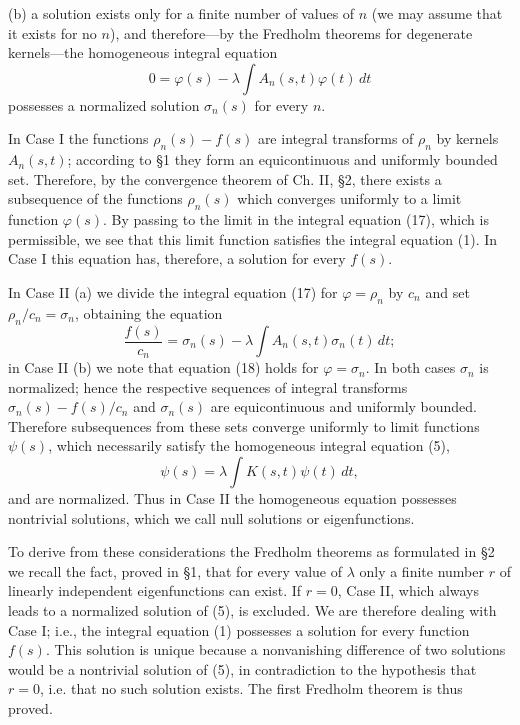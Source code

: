 (b) a solution exists only for a finite number of values of $n$ (we may assume that it exists for no $n$), and therefore---by the Fredholm theorems for degenerate kernels---the homogeneous integral equation
\begin{equation}\tag{18}
0=\varphi(s)-\lambda\int A_n(s,t)\varphi(t)\,dt
\end{equation}
possesses a normalized solution $\sigma_n(s)$ for every $n$.

In Case I the functions $\rho_n(s)-f(s)$ are integral transforms of $\rho_n$ by kernels $A_n(s,t)$; according to \S1 they form an equicontinuous and uniformly bounded set. Therefore, by the convergence theorem of Ch. II, \S2, there exists a subsequence of the functions $\rho_n(s)$ which converges uniformly to a limit function $\varphi(s)$. By passing to the limit in the integral equation (17), which is permissible, we see that this limit function satisfies the integral equation (1). In Case I this equation has, therefore, a solution for every $f(s)$.

In Case II (a) we divide the integral equation (17) for $\varphi=\rho_n$ by $c_n$ and set $\rho_n/c_n=\sigma_n$, obtaining the equation
\[
\frac{f(s)}{c_n}=\sigma_n(s)-\lambda\int A_n(s,t)\sigma_n(t)\,dt;
\]
in Case II (b) we note that equation (18) holds for $\varphi=\sigma_n$. In both cases $\sigma_n$ is normalized; hence the respective sequences of integral transforms $\sigma_n(s)-f(s)/c_n$ and $\sigma_n(s)$ are equicontinuous and uniformly bounded. Therefore subsequences from these sets converge uniformly to limit functions $\psi(s)$, which necessarily satisfy the homogeneous integral equation (5),
\[
\psi(s)=\lambda\int K(s,t)\psi(t)\,dt,
\]
and are normalized. Thus in Case II the homogeneous equation possesses nontrivial solutions, which we call null solutions or eigenfunctions.

To derive from these considerations the Fredholm theorems as formulated in \S2 we recall the fact, proved in \S1, that for every value of $\lambda$ only a finite number $r$ of linearly independent eigenfunctions can exist. If $r=0$, Case II, which always leads to a normalized solution of (5), is excluded. We are therefore dealing with Case I; i.e., the integral equation (1) possesses a solution for every function $f(s)$. This solution is unique because a nonvanishing difference of two solutions would be a nontrivial solution of (5), in contradiction to the hypothesis that $r=0$, i.e. that no such solution exists. The first Fredholm theorem is thus proved.

